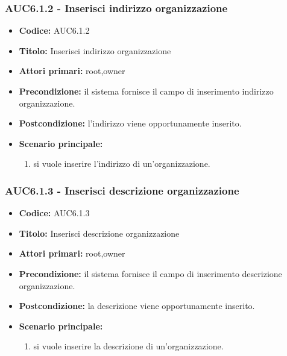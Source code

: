 \documentclass[casi-duso]{subfiles}
\begin{document}
  \subsubsection{AUC6.1.2 - Inserisci indirizzo organizzazione}%
  \label{subsub:AUC6.1.2}
  \begin{itemize}
    \item \textbf{Codice:} AUC6.1.2
    \item \textbf{Titolo:} Inserisci indirizzo organizzazione
    \item \textbf{Attori primari:} root,owner
    \item \textbf{Precondizione:} il sistema fornisce il campo di inserimento indirizzo organizzazione.
    \item \textbf{Postcondizione:} l'indirizzo viene opportunamente inserito.
    \item \textbf{Scenario principale:}
    \begin{enumerate}
      \item si vuole inserire l'indirizzo di un'organizzazione.
    \end{enumerate}
  \end{itemize}
  
  \subsubsection{AUC6.1.3 - Inserisci descrizione organizzazione}%
  \label{subsub:AUC6.1.3}
  \begin{itemize}
    \item \textbf{Codice:} AUC6.1.3
    \item \textbf{Titolo:} Inserisci descrizione organizzazione
    \item \textbf{Attori primari:} root,owner
    \item \textbf{Precondizione:} il sistema fornisce il campo di inserimento descrizione organizzazione.
    \item \textbf{Postcondizione:} la descrizione viene opportunamente inserito.
    \item \textbf{Scenario principale:}
    \begin{enumerate}
      \item si vuole inserire la descrizione di un'organizzazione.
    \end{enumerate}
  \end{itemize}
\end{document}
